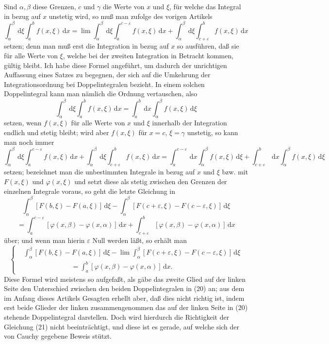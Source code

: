 \documentclass[11pt]{article}
\newcommand{\dd}{\,\mathrm d}
\begin{document}
Sind $\alpha,\beta$ diese Grenzen, $c$ und $\gamma$ die Werte von $x$ und $\xi$, für welche das Integral in bezug auf $x$ unstetig wird, so muß man zufolge des vorigen Artikels
\begin{equation}
\int_\alpha^\beta \dd\xi\int_a^b f(x,\xi)\dd x=
\lim\int_\alpha^\beta\dd\xi\int_a^{c-\varepsilon} f(x,\xi)\dd x+
\int_\alpha^\beta\dd\xi\int_{c+\varepsilon}^b f(x,\xi)\dd x
\tag{19}
\end{equation}
setzen; denn man muß erst die Integration in bezug auf $x$ so ausführen, daß sie für alle Werte von $\xi$, welche bei der zweiten Integration in Betracht kommen, gültig bleibt. Ich habe diese Formel angeführt, um dadurch der unrichtigen Auffassung eines Satzes zu begegnen, der sich auf die Umkehrung der Integrationsordnung bei Doppelintegralen bezieht. In einem solchen Doppelintegral kann man nämlich die Ordnung vertauschen, also
\begin{equation}
\int_\alpha^\beta \dd\xi\int_a^b f(x,\xi)\dd x=
\int_a^b \dd x\int_\alpha^\beta f(x,\xi)\dd\xi
\tag{20}
\end{equation}
setzen, wenn $f(x,\xi)$ für alle Werte von $x$ und $\xi$ innerhalb der Integration endlich und stetig bleibt; wird aber $f(x,\xi)$ für $x=c$, $\xi=\gamma$ unstetig, so kann man noch immer
\[
\int_\alpha^\beta\dd\xi\int_a^{c-\varepsilon}f(x,\xi)\dd x
+\int_\alpha^\beta\dd\xi\int_{c+\varepsilon}^b f(x,\xi)\dd x
=\int_a^{c-\varepsilon}\dd x\int_\alpha^\beta f(x,\xi)\dd\xi
+\int_{c+\varepsilon}^b\dd x\int_\alpha^\beta f(x,\xi)\dd\xi
\]
setzen; bezeichnet man die unbestimmten Integrale in bezug auf $x$ und $\xi$ bzw. mit $F(x,\xi)$ und $\varphi(x,\xi)$ und setzt diese als stetig zwischen den Grenzen der einzelnen Integrale voraus, so geht die letzte Gleichung in
\[
\int_\alpha^\beta [F(b,\xi)-F(a,\xi)]\dd\xi-
\int_\alpha^\beta [F(c+\varepsilon,\xi)-F(c-\varepsilon,\xi)]\dd\xi
\]
\[
=\int_a^{c-\varepsilon}[\varphi(x,\beta)-\varphi(x,\alpha)]\dd x
+\int_{c+\varepsilon}^b[\varphi(x,\beta)-\varphi(x,\alpha)]\dd x
\]
über; und wenn man hierin $\varepsilon$ Null werden läßt, so erhält man
\begin{equation}
\left\{
\begin{aligned}
&\int_\alpha^\beta [F(b,\xi)-F(a,\xi)]\dd\xi
-\lim\int_\alpha^\beta [F(c+\varepsilon,\xi)-F(c-\varepsilon,\xi)]\dd\xi \\
&\hspace{7em}=\int_a^b[\varphi(x,\beta)-\varphi(x,\alpha)]\dd x .
\end{aligned}
\right.
\tag{21}
\end{equation}
Diese Formel wird meistens so aufgefaßt, als gäbe das zweite Glied auf der linken Seite den Unterschied zwischen den beiden Doppelintegralen in (20) an; aus dem im Anfang dieses Artikels Gesagten erhellt aber, daß dies nicht richtig ist, indem erst beide Glieder der linken zusammengenommen das auf der linken Seite in (20) stehende Doppelintegral darstellen. Doch wird hierdurch die Richtigkeit der Gleichung (21) nicht beeinträchtigt, und diese ist es gerade, auf welche sich der von Cauchy gegebene Beweis stützt.
\end{document}
